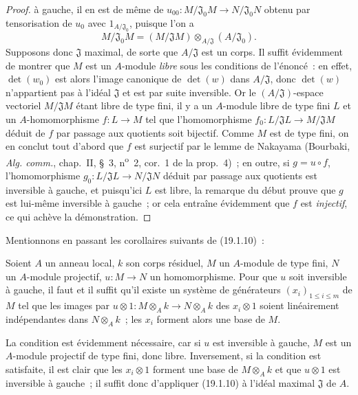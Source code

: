 \begin{proof}
à gauche, il en est de même de
$u_{00}:M/\mathfrak J_0M\to N/\mathfrak J_0N$ obtenu par tensorisation de
$u_0$ avec $1_{A/\mathfrak J_0}$, puisque l'on a
\[
  M/\mathfrak J_0M=(M/\mathfrak JM)\otimes_{A/\mathfrak J}(A/\mathfrak J_0).
\]
Supposons donc $\mathfrak J$ maximal, de sorte que $A/\mathfrak J$ est un
corps. Il suffit évidemment de montrer que $M$ est un $A$-module \emph{libre}
sous les conditions de l'énoncé~: en effet, $\det(w_0)$ est alors l'image
canonique de $\det(w)$ dans $A/\mathfrak J$, donc $\det(w)$ n'appartient pas à
l'idéal $\mathfrak J$ et est par suite inversible. Or le
$(A/\mathfrak J)$-espace vectoriel $M/\mathfrak JM$ étant libre de type fini,
il y a un $A$-module libre de type fini $L$ et un $A$-homomorphisme $f:L\to M$ tel
que l'homomorphisme $f_0:L/\mathfrak JL\to M/\mathfrak JM$ déduit de $f$ par
passage aux quotients soit bijectif. Comme $M$ est de type fini, on en conclut
tout d'abord que $f$ est surjectif par le lemme de Nakayama (Bourbaki,
\emph{Alg. comm.}, chap.~II, §~3, n\textsuperscript{o}~2, cor.~1 de la
prop.~4)~; en outre, si $g=u\circ f$, l'homomorphisme
$g_0:L/\mathfrak JL\to N/\mathfrak JN$ déduit par passage aux quotients est
inversible à gauche, et puisqu'ici $L$ est libre, la remarque du début prouve
que $g$ est lui-même inversible à gauche~; or cela entraîne évidemment que
$f$ est \emph{injectif}, ce qui achève la démonstration.
\end{proof}

Mentionnons en passant les corollaires suivants de (19.1.10)~:

\begin{corollary}[19.1.11]
\label{0.19.1.11-fr}
Soient $A$ un anneau local, $k$ son corps résiduel, $M$ un $A$-module de type
fini, $N$ un $A$-module projectif, $u:M\to N$ un homomorphisme. Pour que $u$
soit inversible à gauche, il faut et il suffit qu'il existe un système de
générateurs $(x_i)_{1\leq i\leq m}$ de $M$ tel que les images par
$u\otimes 1:M\otimes_Ak\to N\otimes_Ak$ des $x_i\otimes1$ soient linéairement
indépendantes dans $N\otimes_Ak$~; les $x_i$ forment alors une base de $M$.
\end{corollary}

La condition est évidemment nécessaire, car si $u$ est inversible à gauche,
$M$ est un $A$-module projectif de type fini, donc libre. Inversement, si la
condition est satisfaite, il est clair que les $x_i\otimes1$ forment une base
de $M\otimes_Ak$ et que $u\otimes1$ est inversible à gauche~; il suffit donc
d'appliquer (19.1.10) à l'idéal maximal $\mathfrak J$ de $A$.


